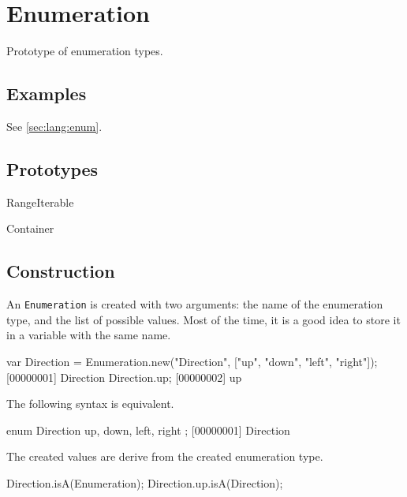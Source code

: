 
\section{Enumeration}

Prototype of enumeration types.

\subsection{Examples}

See \autoref{sec:lang:enum}.

\subsection{Prototypes}
\begin{refObjects}
\item[RangeIterable]
\item[Container]
\end{refObjects}

\subsection{Construction}

An \lstinline{Enumeration} is created with two arguments: the name of the
enumeration type, and the list of possible values.  Most of the time, it is
a good idea to store it in a variable with the same name.

\begin{urbiscript}[firstnumber=1]
var Direction = Enumeration.new("Direction", ["up", "down", "left", "right"]);
[00000001] Direction
Direction.up;
[00000002] up
\end{urbiscript}

The following syntax is equivalent.

\begin{urbiunchecked}
enum Direction
{
  up,
  down,
  left,
  right
};
[00000001] Direction
\end{urbiunchecked}

The created values are derive from the created enumeration type.

\begin{urbiassert}
Direction.isA(Enumeration);
Direction.up.isA(Direction);
\end{urbiassert}

